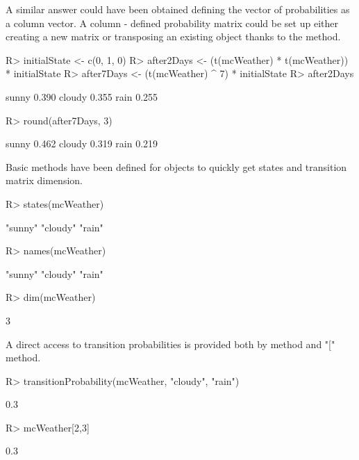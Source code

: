 \documentclass[nojss]{jss}
\begin{document}
A similar answer could have been obtained defining the vector of probabilities as a column vector. A column - defined probability matrix could be set up either creating a new matrix or transposing an existing  object thanks to the  method.

\begin{Schunk}
\begin{Sinput}
R> initialState <- c(0, 1, 0)
R> after2Days <- (t(mcWeather) * t(mcWeather)) * initialState
R> after7Days <- (t(mcWeather) ^ 7) * initialState
R> after2Days
\end{Sinput}
\begin{Soutput}
        [,1]
sunny  0.390
cloudy 0.355
rain   0.255
\end{Soutput}
\begin{Sinput}
R> round(after7Days, 3)
\end{Sinput}
\begin{Soutput}
        [,1]
sunny  0.462
cloudy 0.319
rain   0.219
\end{Soutput}
\end{Schunk}

Basic methods have been defined for  objects to
quickly get states and transition matrix dimension.

\begin{Schunk}
\begin{Sinput}
R> states(mcWeather)
\end{Sinput}
\begin{Soutput}
[1] "sunny"  "cloudy" "rain"  
\end{Soutput}
\begin{Sinput}
R> names(mcWeather)
\end{Sinput}
\begin{Soutput}
[1] "sunny"  "cloudy" "rain"  
\end{Soutput}
\begin{Sinput}
R> dim(mcWeather)
\end{Sinput}
\begin{Soutput}
[1] 3
\end{Soutput}
\end{Schunk}

A direct access to transition probabilities is provided both by  method and "[" method.

\begin{Schunk}
\begin{Sinput}
R> transitionProbability(mcWeather, "cloudy", "rain")
\end{Sinput}
\begin{Soutput}
[1] 0.3
\end{Soutput}
\begin{Sinput}
R> mcWeather[2,3]
\end{Sinput}
\begin{Soutput}
[1] 0.3
\end{Soutput}
\end{Schunk}
\end{document}
